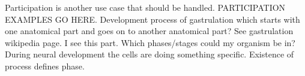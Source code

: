 \begin{itemize}
Participation is another use case that should be handled. 
PARTICIPATION EXAMPLES GO HERE.
Development process of gastrulation which starts with one anatomical part and goes on to another anatomical part? See gastrulation wikipedia page. 
I see this part. Which phases/stages could my organism be in?
During neural development the cells are doing something specific. Existence of process defines phase.




\end{itemize}



